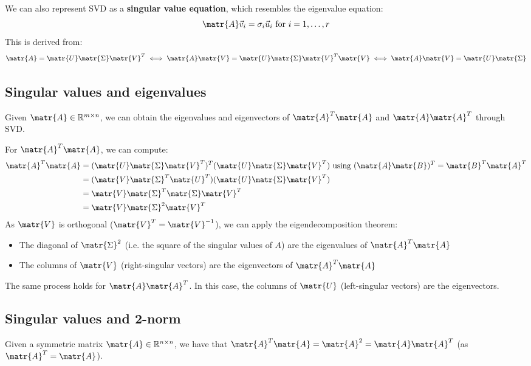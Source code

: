 We can also represent SVD as a \textbf{singular value equation}, which resembles the eigenvalue equation:
\[  \matr{A}\vec{v}_i = \sigma_i\vec{u}_i \text{ for } i = 1, \dots, r \]
This is derived from:
\[ 
    \matr{A} = \matr{U}\matr{\Sigma}\matr{V}^T 
        \iff \matr{A}\matr{V} = \matr{U}\matr{\Sigma}\matr{V}^T\matr{V} 
        \iff \matr{A}\matr{V} = \matr{U}\matr{\Sigma}
\]

\subsection{Singular values and eigenvalues}
Given $\matr{A} \in \mathbb{R}^{m \times n}$, we can obtain the eigenvalues and eigenvectors 
of $\matr{A}^T\matr{A}$ and $\matr{A}\matr{A}^T$ through SVD.

For $\matr{A}^T\matr{A}$, we can compute:
\[
\begin{split}
    \matr{A}^T\matr{A} & = (\matr{U}\matr{\Sigma}\matr{V}^T)^T(\matr{U}\matr{\Sigma}\matr{V}^T) \text{ using } (\matr{A}\matr{B})^T = \matr{B}^T\matr{A}^T \\
        & = (\matr{V}\matr{\Sigma}^T\matr{U}^T)(\matr{U}\matr{\Sigma}\matr{V}^T) \\
        & = \matr{V}\matr{\Sigma}^T\matr{\Sigma}\matr{V}^T \\
        & = \matr{V}\matr{\Sigma}^2\matr{V}^T
\end{split}    
\]
As $\matr{V}$ is orthogonal ($\matr{V}^T = \matr{V}^{-1}$), we can apply the eigendecomposition theorem:
\begin{itemize}
    \item The diagonal of $\matr{\Sigma}^2$ (i.e. the square of the singular values of $A$) are the eigenvalues of $\matr{A}^T\matr{A}$
    \item The columns of $\matr{V}$ (right-singular vectors) are the eigenvectors of $\matr{A}^T\matr{A}$
\end{itemize}

The same process holds for $\matr{A}\matr{A}^T$. In this case, the columns of $\matr{U}$ (left-singular vectors) are the eigenvectors.


\subsection{Singular values and 2-norm}
Given a symmetric matrix $\matr{A} \in \mathbb{R}^{n \times n}$, 
we have that $\matr{A}^T\matr{A} = \matr{A}^2 = \matr{A}\matr{A}^T$ (as $\matr{A}^T = \matr{A}$).

